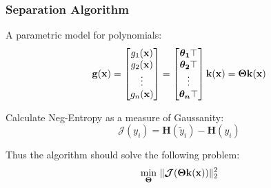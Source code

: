 \documentclass[usenames,dvipsnames]{beamer}
\begin{document}
\begin{frame}
\frametitle{Separation Algorithm}
A parametric model for polynomials:
\begin{equation*}
\label{E_Parametrizing}
{\bf g}({\bf x})=
\begin{bmatrix}
g_1({\bf x}) \\
g_2({\bf x}) \\
\vdots \\
g_n({\bf x})
\end{bmatrix}=
\begin{bmatrix}
\boldsymbol{\theta_1}\top \\
\boldsymbol{\theta_2}\top \\
\vdots \\
\boldsymbol{\theta_n}\top
\end{bmatrix}{\bf k}({\bf x})=
\boldsymbol{\Theta}{\bf k}({\bf x})
\end{equation*}

Calculate Neg-Entropy as a measure of Gaussanity:
\begin{equation*}
\label{E_NegEntropy}
\boldsymbol{\mathcal{J}}({ y_i})=\boldsymbol{H}({ \tilde{y}_i})-\boldsymbol{H}({ y_i})
\end{equation*}


Thus the algorithm should solve the following problem:
\begin{equation*}
\underset{\boldsymbol{\Theta}}{\min} \ \| \boldsymbol{\mathcal{J}}(\boldsymbol{\Theta}{\bf k}({\bf x})) \|_2^2
\end{equation*}
\end{frame}
\end{document}
